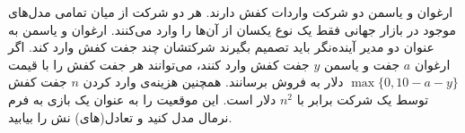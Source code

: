 ارغوان و یاسمن دو شرکت واردات کفش دارند. هر دو شرکت از میان تمامی مدل‌های موجود در بازار جهانی فقط یک نوع یکسان از آن‌ها را وارد می‌کنند. ارغوان و یاسمن به عنوان دو مدیر آینده‌نگر باید تصمیم بگیرند شرکتشان چند جفت کفش وارد کند. اگر ارغوان
$a$
جفت و یاسمن
$y$
جفت کفش وارد کنند، می‌توانند هر جفت کفش را با قیمت
$\max\{0, 10 - a - y\}$
دلار به فروش برسانند. همچنین هزینه‌ی وارد کردن
$n$
جفت کفش توسط یک شرکت برابر با
$n^2$
دلار است. این موقعیت را به عنوان یک بازی به فرم نرمال مدل کنید و تعادل(های) نش را بیابید.